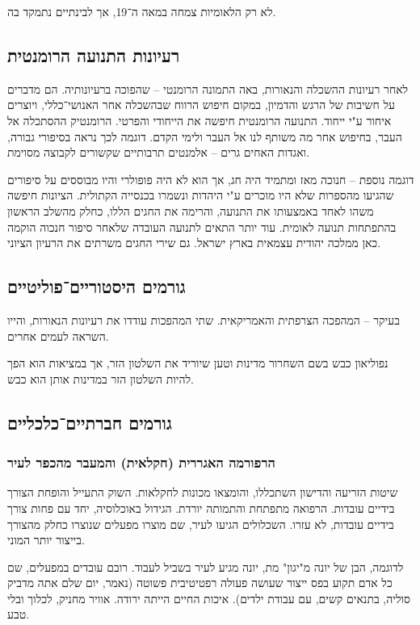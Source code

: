 \documentclass[a4paper]{book}
\begin{document}
	לא רק הלאומיות צמחה במאה ה־19, אך לבינתיים נתמקד בה. 
	
	\subsection{רעיונות התנועה הרומנטית}
	לאחר רעיונות ההשכלה והנאורות, באה התמונה הרומנטי – שהפוכה ברעיונותיה. הם מדברים על חשיבות של הרגש והדמיון, במקום חיפוש הרווח שבהשכלה אחר האנושי־כללי, ויוצרים איחור ע"י ייחוד. התנועה הרומנטית חיפשה את הייחודי והפרטי. הרומנטיק ההסתכלה אל העבר, בחיפוש אחר מה משותף לנו אל העבר ולימי הקדם. דוגמה לכך נראה בסיפורי גבורה, ואגדות האחים גרים – אלמנטים תרבותיים שקשורים לקבוצה מסוימת. 
	
	דוגמה נוספת – חנוכה מאז ומתמיד היה חג, אך הוא לא היה פופולרי והיו מבוססים על סיפורים שהגיעו מהספרות שלא היו מוכרים ע"י היהדות ונשמרו בכנסייה הקתולית. הציונות חיפשה משהו לאחד באמצעותו את התנועה, והרימה את החגים הללו, כחלק מהשלב הראשון בהתפתחות תנועה לאומית. עוד יותר התאים לתנועה העובדה שלאחר סיפור חנכוה הוקמה כאן ממלכה יהודית עצמאית בארץ ישראל. גם שירי החגים משרתים את הרעיון הציוני. 
	
	\subsection{גורמים היסטוריים־פוליטיים}
	בעיקר – המהפכה הצרפתית והאמריקאית. שתי המהפכות עודדו את רעיונות הנאורות, והייו השראה לעמים אחרים. 
	
	נפוליאון כבש בשם השחרור מדינות וטען שיוריד את השלטון הזר, אך במציאות הוא הפך להיות השלטון הזר במדינות אותן הוא כבש. 
	\subsection{גורמים חברתיים־כלכליים}
	\subsubsection{הרפורמה האגררית (חקלאית) והמעבר מהכפר לעיר}
	שיטות הזריעה והדישון השתכללו, והומצאו מכונות לחקלאות. השוק התעייל והופחת הצורך בידיים עובדות. הרפואה מתפתחת והתמותה יורדת. הגידול באוכלוסיה, יחד עם פחות צורך בידיים עובדות, לא עזרו. השכלולים הגיעו לעיר, שם מוצרו מפעלים שנוצרו כחלק מהצורך בייצור יותר המוני. 
	
	לדוגמה, הבן של יונה מ"יגון" מת, יונה מגיע לעיר בשביל לעבוד. רובם עובדים במפעלים, שם כל אדם תקוע בפס ייצור שעושה פעולה רפטיטיבית פשוטה (נאמר, יום שלם אתה מדביק סוליה, בתנאים קשים, עם עבודת ילדים). איכות החיים הייתה ירודה. אוויר מחניק, לכלוך ובלי טבע. 
	
\end{document}
